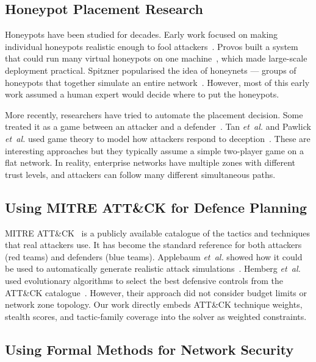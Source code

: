 \documentclass[journal]{IEEEtran}
\newcommand{\etal}{\emph{et~al.}}
\begin{document}
\subsection{Honeypot Placement Research}

Honeypots have been studied for decades. Early work focused on
making individual honeypots realistic enough to fool
attackers~\cite{spitzner2003honeypots}. Provos built a system
that could run many virtual honeypots on one
machine~\cite{provos2004virtual}, which made large-scale deployment
practical. Spitzner popularised the idea of honeynets --- groups
of honeypots that together simulate an entire
network~\cite{spitzner2003honeypots}. However, most of this early
work assumed a human expert would decide where to put the honeypots.

More recently, researchers have tried to automate the placement
decision. Some treated it as a game between an attacker and a
defender~\cite{yuill2004honeypots}. Tan \etal{} and Pawlick
\etal{} used game theory to model how attackers respond to
deception~\cite{tan2011,pawlick2019game}. These are interesting
approaches but they typically assume a simple two-player game on a
flat network. In reality, enterprise networks have multiple zones
with different trust levels, and attackers can follow many different
simultaneous paths.

\subsection{Using MITRE ATT\&CK for Defence Planning}

MITRE ATT\&CK~\cite{mitre2023} is a publicly available catalogue
of the tactics and techniques that real attackers use. It has
become the standard reference for both attackers (red teams) and
defenders (blue teams). Applebaum \etal{} showed how it could be
used to automatically generate realistic attack
simulations~\cite{applebaum2016intelligent}. Hemberg \etal{} used
evolutionary algorithms to select the best defensive controls from
the ATT\&CK catalogue~\cite{hemberg2020}. However, their approach
did not consider budget limits or network zone topology. Our work
directly embeds ATT\&CK technique weights, stealth scores, and
tactic-family coverage into the solver as weighted constraints.

\subsection{Using Formal Methods for Network Security}
\end{document}
